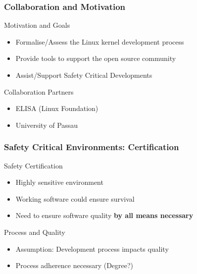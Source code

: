 \documentclass[9pt]{beamer}
\begin{document}

	\begin{frame}
	\frametitle{Collaboration and Motivation}
		\begin{block}{Motivation and Goals}
			\begin{itemize}
				\item Formalise/Assess the Linux kernel development process
				\item Provide tools to support the open source community
				\item Assist/Support Safety Critical Developments
			\end{itemize}
		\end{block}
		\begin{block}{Collaboration Partners}
			\begin{itemize}
				\item ELISA (Linux Foundation)
				\item University of Passau
			\end{itemize}
		\end{block}
	\end{frame}

	\begin{frame}
	\frametitle{Safety Critical Environments: Certification}
		\begin{block}{Safety Certification}
			\begin{itemize}
				\item Highly sensitive environment
				\item Working software could ensure survival
				\item Need to ensure software quality \textbf{by all means necessary}
			\end{itemize}
		\end{block}
		\begin{block}{Process and Quality}
			\begin{itemize}
				\item Assumption: Development process impacts quality
				\item Process adherence necessary (Degree?)
			\end{itemize} 
		\end{block}

	\end{frame}
\end{document}
